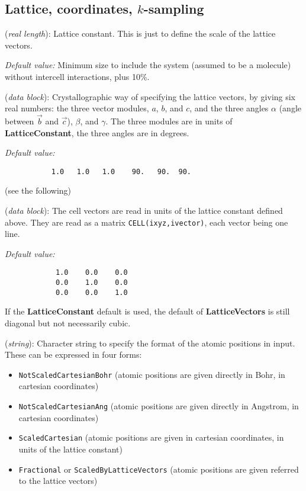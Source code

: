 \vspace{5pt}
\subsection{Lattice, coordinates, $k$-sampling}

\begin{description}
\itemsep 10pt
\parsep 0pt


\item[{\bf LatticeConstant}] ({\it real length}): Lattice constant.
This is just to define the scale of the lattice vectors.

{\it Default value:} Minimum size to include the system (assumed to be a 
molecule) without intercell interactions, plus 10\%. 

\item[{\bf LatticeParameters}] ({\it data block}):
Crystallographic way of specifying the lattice vectors, by giving
six real numbers: the three vector modules, $a$, $b$, and $c$, and
the three angles $\alpha$ (angle between $\vec b$ and $\vec c$),
$\beta$, and $\gamma$. The three modules are in units of 
{\bf LatticeConstant}, the three angles are in degrees.

{\it Default value:}
\begin{verbatim}
           1.0   1.0   1.0    90.   90.  90.
\end{verbatim}
\noindent
(see the following)

\item[{\bf LatticeVectors}] ({\it data block}): 
The cell vectors are read in units of the lattice constant defined above. 
They are read as a matrix {\tt CELL(ixyz,ivector)}, each vector being
one line.

{\it Default value:} 
\begin{verbatim}
            1.0    0.0    0.0 
            0.0    1.0    0.0 
            0.0    0.0    1.0 
\end{verbatim}
\noindent
If the {\bf LatticeConstant} default is used, the default of 
{\bf LatticeVectors} is still diagonal but not necessarily cubic.

\item[{\bf AtomicCoordinatesFormat}] ({\it string}): 
Character string to specify the format of the atomic positions in
input. These can be expressed in four forms:
\begin{itemize}
\item {\tt NotScaledCartesianBohr} (atomic positions are given directly in
Bohr, in cartesian coordinates)
\item {\tt NotScaledCartesianAng} (atomic positions are given directly in
Angstrom, in cartesian coordinates)
\item {\tt ScaledCartesian} (atomic positions are given 
in cartesian coordinates, in units of the lattice constant)
\item {\tt Fractional} or {\tt ScaledByLatticeVectors} (atomic positions 
are given referred to the lattice vectors)
\end{itemize}


\end{description}
